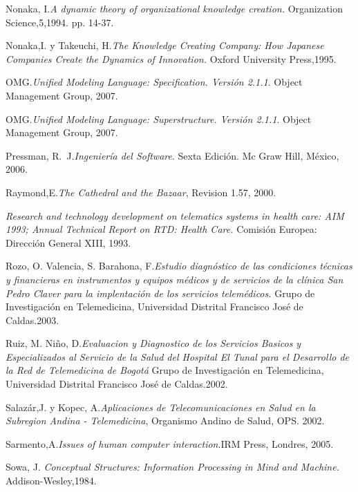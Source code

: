 \begin{thebibliography}{}
 Nonaka, I.\textit{A dynamic theory of organizational knowledge creation.} Organization Science,5,1994. pp. 14-37.

 Nonaka,I. y Takeuchi, H.\textit{The Knowledge Creating Company: How Japanese Companies Create the Dynamics of Innovation.} Oxford University Press,1995.

 OMG.\textit{Unified Modeling Language: Specification. Versión 2.1.1}. Object Management Group, 2007.

 OMG.\textit{Unified Modeling Language: Superstructure. Versión 2.1.1}. Object Management Group, 2007.

 Pressman, R.~J.\textit{Ingeniería del Software}. Sexta Edición. Mc Graw 
Hill, México, 2006.

 Raymond,E.\textit{The Cathedral and the Bazaar}, Revision 1.57, 2000.

 \textit{Research and technology development on telematics systems in health care: AIM 1993; Annual Technical Report on RTD: Health Care.} Comisión Europea: Dirección General XIII, 1993.

 Rozo, O. Valencia, S. Barahona, F.\textit{Estudio diagnóstico de las condiciones técnicas y financieras en instrumentos y equipos médicos  y de servicios de la clínica San Pedro Claver para la implentación de los servicios telemédicos.} Grupo de Investigación en Telemedicina,  Universidad Distrital Francisco José de Caldas.2003.

 Ruiz, M. Niño, D.\textit{Evaluacion y Diagnostico de los Servicios Basicos y Especializados al Servicio de la Salud del Hospital El Tunal para el Desarrollo de la Red de Telemedicina de Bogotá} Grupo de Investigación en Telemedicina,  Universidad Distrital Francisco José de Caldas.2002.

 Salazár,J. y Kopec, A.\textit{Aplicaciones de Telecomunicaciones en Salud en la Subregion Andina - Telemedicina}, Organismo Andino de Salud, OPS. 2002.

 Sarmento,A.\textit{Issues of human computer interaction}.IRM Press, Londres, 2005. 

 Sowa, J. \textit{Conceptual Structures: Information Processing in Mind and Machine.} Addison-Wesley,1984.


\end{thebibliography}
